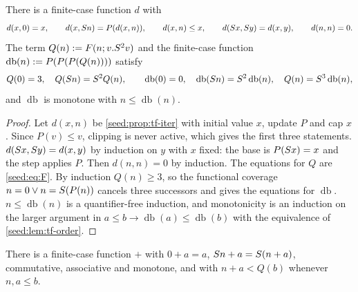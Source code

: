 \begin{lemma}\label{seed:lem:tf-diff}
There is a finite-case function $d$ with
\[
 d(x,0)=x,\qquad d(x,S n)=P(d(x,n)),\qquad d(x,n)\leq x,\qquad
 d(S x,S y)=d(x,y),\qquad d(n,n)=0 .
\]
The term $Q(n)\mathrel{:=} F(n;v.S^2v)$ and the finite-case function
$\operatorname{db}(n)\mathrel{:=} P(P(P(Q(n))))$ satisfy
\[
 Q(0)=3,\quad Q(S n)=S^2Q(n),\qquad
 \operatorname{db}(0)=0,\quad
 \operatorname{db}(S n)=S^2\operatorname{db}(n),\quad
 Q(n)=S^3\operatorname{db}(n),
\]
and $\operatorname{db}$ is monotone with $n\leq\operatorname{db}(n)$.
\end{lemma}

\begin{proof}
Let $d(x,n)$ be \cref{seed:prop:tf-iter} with initial value $x$, update $P$
and cap $x$. Since $P(v)\leq v$, clipping is never active, which gives the
first three statements. $d(S x,S y)=d(x,y)$ by induction on $y$ with
$x$ fixed: the base is $P(S x)=x$ and the step applies $P$. Then
$d(n,n)=0$ by induction. The equations for $Q$ are \eqref{seed:eq:F}. By
induction $Q(n)\geq3$, so the functional coverage $n=0\lor n=S(P(n))$
cancels three successors and gives the equations for $\operatorname{db}$.
$n\leq\operatorname{db}(n)$ is a quantifier-free induction, and monotonicity
is an induction on the larger argument in
$a\leq b\to\operatorname{db}(a)\leq\operatorname{db}(b)$ with the
equivalence of \cref{seed:lem:tf-order}.
\end{proof}

\begin{lemma}[Addition]\label{seed:lem:tf-add}
There is a finite-case function $+$ with $0+a=a$,
$S n+a=S(n+a)$, commutative, associative and monotone, and with
$n+a<Q(b)$ whenever $n,a\leq b$.
\end{lemma}

